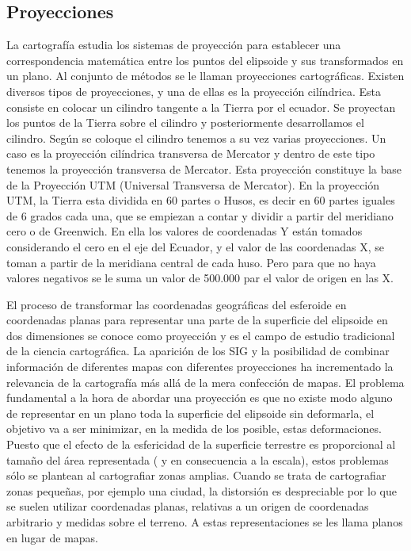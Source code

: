 \subsection{Proyecciones}

La cartografía estudia los sistemas de proyección para establecer una
correspondencia matemática entre los puntos del elipsoide y sus transformados en un
plano. Al conjunto de métodos se le llaman proyecciones cartográficas. Existen
diversos tipos de proyecciones, y una de ellas es la proyección cilíndrica. Esta consiste
en colocar un cilindro tangente a la Tierra por el ecuador. Se proyectan los puntos de la
Tierra sobre el cilindro y posteriormente desarrollamos el cilindro. Según se coloque el
cilindro tenemos a su vez varias proyecciones. Un caso es la proyección cilíndrica
transversa de Mercator y dentro de este tipo tenemos la proyección transversa de
Mercator. Esta proyección constituye la base de la Proyección UTM (Universal
Transversa de Mercator).
En la proyección UTM, la Tierra esta dividida en 60 partes o Husos, es decir en
60 partes iguales de 6 grados cada una, que se empiezan a contar y dividir a partir del
meridiano cero o de Greenwich. En ella los valores de coordenadas Y están tomados
considerando el cero en el eje del Ecuador, y el valor de las coordenadas X, se toman
a partir de la meridiana central de cada huso. Pero para que no haya valores negativos
se le suma un valor de 500.000 par el valor de origen en las X.


El proceso de transformar las coordenadas geográficas del esferoide en coordenadas planas para representar una
parte de la superficie del elipsoide en dos dimensiones se conoce como proyección y es el campo de estudio
tradicional de la ciencia cartográfica. La aparición de los SIG y la posibilidad de combinar información de
diferentes mapas con diferentes proyecciones ha incrementado la relevancia de la cartografía más allá de la
mera confección de mapas.
El problema fundamental a la hora de abordar una proyección es que no existe modo alguno de representar en un
plano toda la superficie del elipsoide sin deformarla, el objetivo va a ser minimizar, en la medida de los posible,
estas deformaciones. Puesto que el efecto de la esfericidad de la superficie terrestre es proporcional al tamaño
del área representada ( y en consecuencia a la escala), estos problemas sólo se plantean al cartografiar zonas
amplias. Cuando se trata de cartografiar zonas pequeñas, por ejemplo una ciudad, la distorsión es despreciable
por lo que se suelen utilizar coordenadas planas, relativas a un origen de coordenadas arbitrario y medidas sobre
el terreno. A estas representaciones se les llama planos en lugar de mapas.


